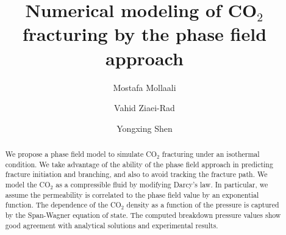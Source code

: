 \documentclass{elsarticle}
\begin{document}
\begin{frontmatter}

\title{Numerical modeling of CO$_2$ fracturing by the phase field approach}


\author[mymainaddress]{Mostafa Mollaali}

\author[mysecondaryaddress]{Vahid Ziaei-Rad}

\author[mymainaddress]{Yongxing Shen}

\address[mymainaddress]{University of Michigan -- Shanghai Jiao Tong University Joint Institute, Shanghai Jiao Tong University,	Shanghai, China}
\address[mysecondaryaddress]{Faculty of Civil, Water and Environmental Engineering, Shahid Beheshti University, Tehran, Iran}

\begin{abstract}

We propose a phase field model to simulate CO$_2$ fracturing under an isothermal condition. We take advantage of the ability of the phase field approach in predicting fracture initiation and branching, and also to avoid tracking the fracture path. We model the CO$_2$ as a compressible fluid by modifying Darcy's law. In particular, we assume the permeability is correlated to the phase field value by an exponential function. The dependence of the CO$_2$ density as a function of the pressure is captured by the Span-Wagner equation of state. The computed breakdown pressure values show good agreement with analytical solutions and experimental results.
\end{abstract}


\end{frontmatter}
\end{document}
